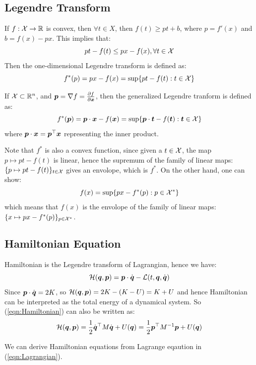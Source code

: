 \documentclass[hidelinks]{article}[12pt]
\begin{document}
\subsection{Legendre Transform}
If $f: {\cal X} \to \mathbb R$ is convex, then $\forall t \in X$, then $f(t) \geq pt + b$, where $p = f'(x)$ and $b = f(x) - px$. This implies that:
\[pt - f(t) \leq px -f(x), \forall t \in {\cal X}\]
Then the one-dimensional Legendre transform is defined as: 
\[f^*(p) = px - f(x) = \sup\{pt - f(t) : t \in {\cal X}\}\]

If ${\cal X} \subset \mathbb R^n$, and $\boldsymbol{p} = \nabla f = \frac{\partial{f}}{\partial{\boldsymbol{x}}}$, then the generalized Legendre tranform is defined as:
\[f^*(\boldsymbol{p}) = \boldsymbol{p} \cdot \boldsymbol{x} - f(\boldsymbol{x}) = \sup\{\boldsymbol{p}\cdot \boldsymbol{t} - f(\boldsymbol{t}) : \boldsymbol{t} \in {\cal X}\}\]
where $\boldsymbol{p} \cdot \boldsymbol{x} = \boldsymbol{p}^{\top} \boldsymbol{x}$ representing the inner product. 

Note that $f^*$ is also a convex function, since given a $t \in {\cal X}$, the map $p \mapsto pt -f(t)$ is linear, hence the supremum of the family of linear maps: $\{p \mapsto pt-f(t)\}_{t \in {\cal X}}$ gives an envolope, which is $f^*$. On the other hand, one can show:
\[f(x) = \sup\{px - f^*(p) : p \in {\cal X}^*\}\]
which means that $f(x)$ is the envolope of the family of linear maps: $\{x \mapsto px - f^*(p)\}_{p \in {\cal X}^*}$. 



\subsection{Hamiltonian Equation}
Hamiltonian is the Legendre transform of Lagrangian, hence we have:
\begin{equation}
{\cal H}(\boldsymbol{q}, \boldsymbol{p}) = \boldsymbol{p} \cdot \dot{\boldsymbol{q}} - {\cal L}(t, \boldsymbol{q}, \dot{\boldsymbol{q}}) \label{eqn:Hamiltonian}
\end{equation}
Since $\boldsymbol{p}\cdot \dot{\boldsymbol{q}} = 2K$, so ${\cal H}(\boldsymbol{q}, \boldsymbol{p}) = 2K - (K - U) = K + U$ and hence Hamiltonian can be interpreted as the total energy of a dynamical system. So (\ref{eqn:Hamiltonian}) can also be written as:
\begin{equation}
{\cal H}(\boldsymbol{q}, \boldsymbol{p}) = \frac12 \dot{\boldsymbol{q}}^\top M \dot{\boldsymbol{q}} + U(\boldsymbol{q}) = \frac12 \boldsymbol{p}^\top M^{-1} \boldsymbol{p} + U(\boldsymbol{q}) \label{eqn:Hamiltonian_2}
\end{equation}


We can derive Hamiltonian equations from Lagrange eqaution in (\ref{eqn:Lagrangian}). 
\end{document}
